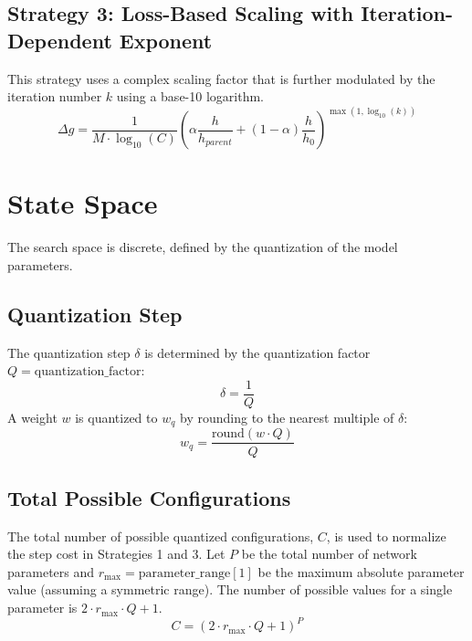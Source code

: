 \documentclass{article}
\begin{document}
\subsection{Strategy 3: Loss-Based Scaling with Iteration-Dependent Exponent}
This strategy uses a complex scaling factor that is further modulated by the iteration number $k$ using a base-10 logarithm.
$$\Delta g = \frac{1}{M \cdot \log_{10}(C)} \left( \alpha \frac{h}{h_{parent}} + (1-\alpha) \frac{h}{h_0} \right)^{\max(1, \log_{10}(k))}$$

\section{State Space}

The search space is discrete, defined by the quantization of the model parameters.

\subsection{Quantization Step}
The quantization step $\delta$ is determined by the quantization factor $Q = \text{quantization\_factor}$:
$$\delta = \frac{1}{Q}$$
A weight $w$ is quantized to $w_q$ by rounding to the nearest multiple of $\delta$:
$$w_q = \frac{\text{round}(w \cdot Q)}{Q}$$

\subsection{Total Possible Configurations}
The total number of possible quantized configurations, $C$, is used to normalize the step cost in Strategies 1 and 3. Let $P$ be the total number of network parameters and $r_{\max} = \text{parameter\_range}[1]$ be the maximum absolute parameter value (assuming a symmetric range). The number of possible values for a single parameter is $2 \cdot r_{\max} \cdot Q + 1$.
$$C = (2 \cdot r_{\max} \cdot Q + 1)^P$$
\end{document}
